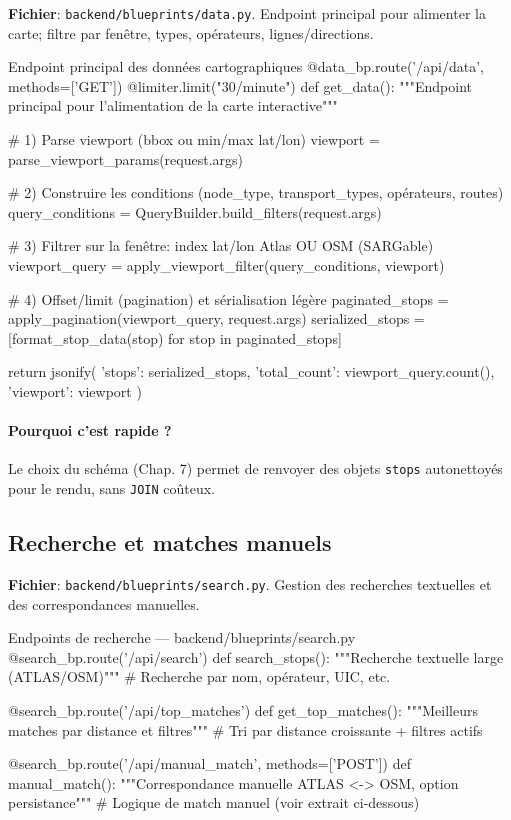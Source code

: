 \textbf{Fichier}: \texttt{backend/blueprints/data.py}. Endpoint principal pour alimenter la carte; filtre par fenêtre, types, opérateurs, lignes/directions.

\begin{codebox}[language=Python]{Endpoint principal des données cartographiques}
@data_bp.route('/api/data', methods=['GET'])
@limiter.limit("30/minute")
def get_data():
    """Endpoint principal pour l'alimentation de la carte interactive"""
    
    # 1) Parse viewport (bbox ou min/max lat/lon)
    viewport = parse_viewport_params(request.args)
    
    # 2) Construire les conditions (node_type, transport_types, opérateurs, routes)
    query_conditions = QueryBuilder.build_filters(request.args)
    
    # 3) Filtrer sur la fenêtre: index lat/lon Atlas OU OSM (SARGable)
    viewport_query = apply_viewport_filter(query_conditions, viewport)
    
    # 4) Offset/limit (pagination) et sérialisation légère
    paginated_stops = apply_pagination(viewport_query, request.args)
    serialized_stops = [format_stop_data(stop) for stop in paginated_stops]
    
    return jsonify({
        'stops': serialized_stops,
        'total_count': viewport_query.count(),
        'viewport': viewport
    })
\end{codebox}

\paragraph{Pourquoi c'est rapide ?} Le choix du schéma (Chap. 7) permet de renvoyer des objets \texttt{stops} autonettoyés pour le rendu, sans \texttt{JOIN} coûteux.

\subsection{Recherche et matches manuels}

\textbf{Fichier}: \texttt{backend/blueprints/search.py}. Gestion des recherches textuelles et des correspondances manuelles.

\begin{codebox}[language=Python]{Endpoints de recherche — backend/blueprints/search.py}
@search_bp.route('/api/search')
def search_stops():
    """Recherche textuelle large (ATLAS/OSM)"""
    # Recherche par nom, opérateur, UIC, etc.

@search_bp.route('/api/top_matches')  
def get_top_matches():
    """Meilleurs matches par distance et filtres"""
    # Tri par distance croissante + filtres actifs

@search_bp.route('/api/manual_match', methods=['POST'])
def manual_match():
    """Correspondance manuelle ATLAS <-> OSM, option persistance"""
    # Logique de match manuel (voir extrait ci-dessous)
\end{codebox}

